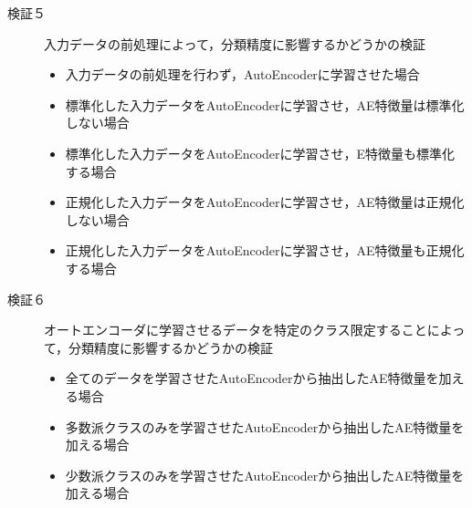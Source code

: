 \begin{description}
    \item [検証５] 入力データの前処理によって，分類精度に影響するかどうかの検証
    \begin{itemize}
        \item 入力データの前処理を行わず，AutoEncoderに学習させた場合
        \item 標準化した入力データをAutoEncoderに学習させ，AE特徴量は標準化しない場合
        \item 標準化した入力データをAutoEncoderに学習させ，E特徴量も標準化する場合
        \item 正規化した入力データをAutoEncoderに学習させ，AE特徴量は正規化しない場合
        \item 正規化した入力データをAutoEncoderに学習させ，AE特徴量も正規化する場合
    \end{itemize}

    \item [検証６] オートエンコーダに学習させるデータを特定のクラス限定することによって，分類精度に影響するかどうかの検証
    \begin{itemize}
        \item 全てのデータを学習させたAutoEncoderから抽出したAE特徴量を加える場合
        \item 多数派クラスのみを学習させたAutoEncoderから抽出したAE特徴量を加える場合
        \item 少数派クラスのみを学習させたAutoEncoderから抽出したAE特徴量を加える場合
    \end{itemize}

    

\end{description}